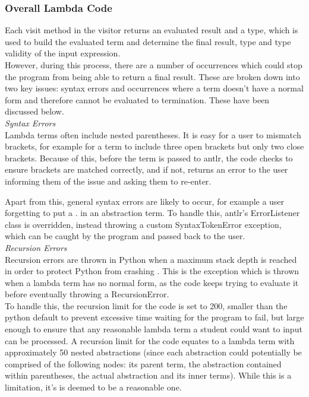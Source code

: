 \documentclass[a4paper,12pt]{report}
\begin{document}
\subsubsection{Overall Lambda Code}
Each visit method in the visitor returns an evaluated result and a type, which is used to build the evaluated term and determine the final result, type and type validity of the input expression.\\

However, during this process, there are a number of occurrences which could stop the program from being able to return a final result. These are broken down into two key issues: syntax errors and occurrences where a term doesn't have a normal form and therefore cannot be evaluated to termination. These have been discussed below.\\

\textit{Syntax Errors}\\
Lambda terms often include nested parentheses. It is easy for a user to mismatch brackets, for example for a term to include three open brackets but only two close brackets. Because of this, before the term is passed to antlr, the code checks to ensure brackets are matched correctly, and if not, returns an error to the user informing them of the issue and asking them to re-enter.

Apart from this, general syntax errors are likely to occur, for example a user forgetting to put a . in an abstraction term. To handle this, antlr's ErrorListener class is overridden, instead throwing a custom SyntaxTokenError exception, which can be caught by the program and passed back to the user.\\

\textit{Recursion Errors}\\
Recursion errors are thrown in Python when a maximum stack depth is reached in order to protect Python from crashing \cite{PythonStack2019}. This is the exception which is thrown when a lambda term has no normal form, as the code keeps trying to evaluate it before eventually throwing a RecursionError.\\

To handle this, the recursion limit for the code is set to 200, smaller than the python default to prevent excessive time waiting for the program to fail, but large enough to ensure that any reasonable lambda term a student could want to input can be processed. A recursion limit for the code equates to a lambda term with approximately 50 nested abstractions (since each abstraction could potentially be comprised of the following nodes: its parent term, the abstraction contained within parentheses, the actual abstraction and its inner terms). While this is a limitation, it's is deemed to be a reasonable one.\\
\end{document}
